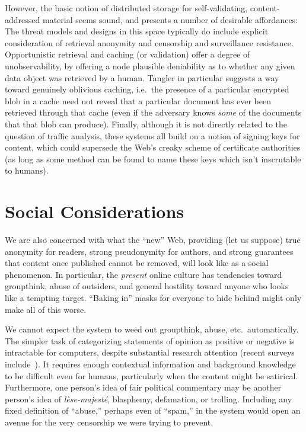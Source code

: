 \documentclass[oneside,tinymargin]{zarticle}
\begin{document}
\begin{multicols}{2}
However, the basic notion of distributed storage for self-validating,
content-addressed material seems sound, and presents a number of
desirable affordances: The threat models and designs in this space
typically do include explicit consideration of retrieval anonymity and
censorship and surveillance resistance.  Opportunistic retrieval and
caching (or validation) offer a degree of unobservability, by offering
a node plausible deniability as to whether any given data object was
retrieved by a human.  Tangler in particular suggests a way toward
genuinely oblivious caching, i.e.\ the presence of a particular
encrypted blob in a cache need not reveal that a particular document
has ever been retrieved through that cache (even if the adversary
knows \emph{some} of the documents that that blob can produce).
Finally, although it is not directly related to the question of
traffic analysis, these systems all build on a notion of signing keys
for content, which could supersede the Web's creaky scheme of
certificate authorities (as long as some method can be found to
name these keys which isn't inscrutable to humans).

\section{Social Considerations}

We are also concerned with what the “new” Web, providing (let us
suppose) true anonymity for readers, strong pseudonymity for authors,
and strong guarantees that content once published cannot be removed,
will look like as a social phenomenon.  In particular, the
\emph{present} online culture has tendencies toward groupthink, abuse
of outsiders, and general hostility toward anyone who looks like a
tempting target. “Baking in” masks for everyone to hide behind might
only make all of this worse.

We cannot expect the system to weed out groupthink, abuse,
etc.\ automatically.  The simpler task of categorizing statements of
opinion as positive or negative is intractable for computers, despite
substantial research attention (recent surveys
include~\textcite{liu2012mining,pang2008mining}).  It requires enough
contextual information and background knowledge to be difficult even
for humans, particularly when the content might be
satirical.~\cite{lamarre2009satire} Furthermore, one person's idea of
fair political commentary may be another person's idea of
\textit{lèse-majesté}, blasphemy, defamation, or trolling.  Including
any fixed definition of “abuse,” perhaps even of “spam,” in the system
would open an avenue for the very censorship we were trying to
prevent.


\end{multicols}
\end{document}

